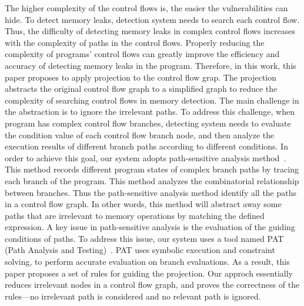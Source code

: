 The higher complexity of the control flows is, the easier the vulnerabilities can hide. To detect memory leaks, detection system needs to search each control flow. Thus, the difficulty of detecting memory leaks in complex control flows increases with the complexity of paths in the control flows. Properly reducing the complexity of programs’ control flows can greatly improve the efficiency and accuracy of detecting memory leaks in the program. Therefore, in this work, this paper proposes to apply projection to the control flow grap. The projection abstracts the original control flow graph to a simplified graph to reduce the complexity of searching control flows in memory detection. The main challenge in the abstraction is to ignore the irrelevant paths. To address this challenge, when program has complex control flow branches, detecting system needs to evaluate the condition value of each control flow branch node, and then analyze the execution results of different branch paths according to different conditions. In order to achieve this goal, our system adopts path-sensitive analysis method~\cite{XA05}. This method records different program states of complex branch paths by tracing each branch of the program. This method analyzes the combinatorial relationship between branches. Thus the path-sensitive analysis method identify all the paths in a control flow graph. In other words, this method will abstract away some paths that are irrelevant to memory operations by matching the defined expression. A key issue in path-sensitive analysis is the evaluation of the guiding conditions of paths. To address this issue, our system uses a tool named PAT (Path Analysis and Testing)~\cite{ZW01}. PAT uses symbolic execution and constraint solving, to perform accurate evaluation on branch evaluations. %
As a result, this paper proposes a set of rules for guiding the projection. Our approch essentially reduces irrelevant nodes in a control flow graph, and proves the correctness of the rules---no irrelevant path is considered and no relevant path is ignored.


